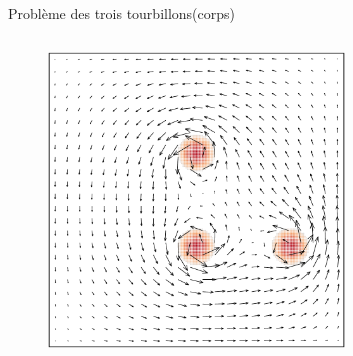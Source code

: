 \documentclass[aspectratio=169]{beamer} %
\begin{document}
\begin{frame}{Problème des trois tourbillons(corps)}
\begin{columns}[t]
\begin{column}{0.55\textwidth}
\begin{figure}[t]
{                    \includegraphics[width=0.7\textwidth]{../../conference/images/particles_ref/particles_ref_0.pdf}%
                }
            \end{figure}
        \end{column}
    \end{columns}
    \vspace{-0.5cm}

\end{frame}
\end{document}
